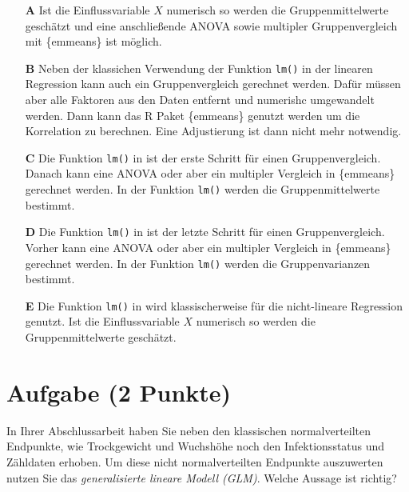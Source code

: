 \documentclass[a4paper, 9pt]{scrartcl}\usepackage[]{graphicx}\usepackage[]{xcolor}
\begin{document}
\begin{enumerate}
\item [\textbf{A} \msquare] Ist die Einflussvariable $X$ numerisch so werden die Gruppenmittelwerte geschätzt und eine anschließende ANOVA sowie multipler Gruppenvergleich mit \{emmeans\} ist möglich.
\item [\textbf{B} \msquare] Neben der klassichen Verwendung der Funktion \texttt{lm()} in der linearen Regression kann auch ein Gruppenvergleich gerechnet werden. Dafür müssen aber alle Faktoren aus den Daten entfernt und numerishc umgewandelt werden. Dann kann das R Paket \{emmeans\} genutzt werden um die Korrelation zu berechnen. Eine Adjustierung ist dann nicht mehr notwendig.
\item [\textbf{C} \msquare] Die Funktion \texttt{lm()} in \Rlogo ist der erste Schritt für einen Gruppenvergleich. Danach kann eine ANOVA oder aber ein multipler Vergleich in \{emmeans\} gerechnet werden. In der Funktion  \texttt{lm()} werden die Gruppenmittelwerte bestimmt.
\item [\textbf{D} \msquare] Die Funktion \texttt{lm()} in \Rlogo ist der letzte Schritt für einen Gruppenvergleich. Vorher kann eine ANOVA oder aber ein multipler Vergleich in \{emmeans\} gerechnet werden. In der Funktion  \texttt{lm()} werden die Gruppenvarianzen bestimmt.
\item [\textbf{E} \msquare] Die Funktion \texttt{lm()} in \Rlogo wird klassischerweise für die nicht-lineare Regression genutzt. Ist die Einflussvariable $X$ numerisch so werden die Gruppenmittelwerte geschätzt.
\end{enumerate}

\section{Aufgabe \hfill (2 Punkte)}



In Ihrer Abschlussarbeit haben Sie neben den klassischen normalverteilten Endpunkte, wie Trockgewicht und Wuchshöhe noch den Infektionsstatus und Zähldaten erhoben. Um diese nicht normalverteilten Endpunkte auszuwerten nutzen Sie das \textit{generalisierte lineare Modell (GLM)}. Welche Aussage ist richtig?
\end{document}
